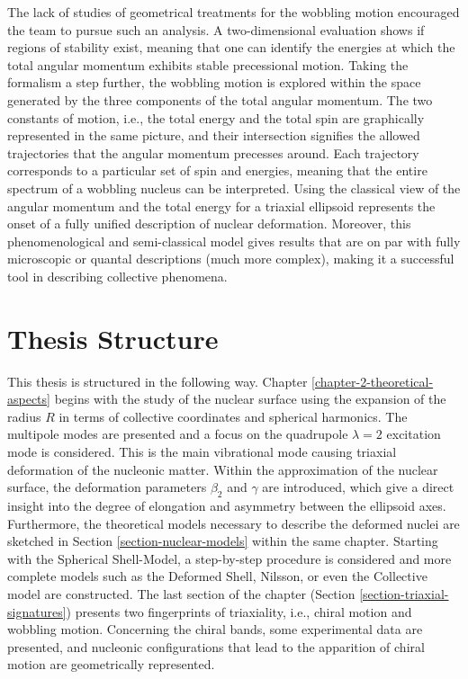 The lack of studies of geometrical treatments for the wobbling motion encouraged the team to pursue such an analysis. A two-dimensional evaluation shows if regions of stability exist, meaning that one can identify the energies at which the total angular momentum exhibits stable precessional motion. Taking the formalism a step further, the wobbling motion is explored within the space generated by the three components of the total angular momentum. The two constants of motion, i.e., the total energy and the total spin are graphically represented in the same picture, and their intersection signifies the allowed trajectories that the angular momentum precesses around. Each trajectory corresponds to a particular set of spin and energies, meaning that the entire spectrum of a wobbling nucleus can be interpreted. Using the classical view of the angular momentum and the total energy for a triaxial ellipsoid represents the onset of a fully unified description of nuclear deformation. Moreover, this phenomenological and semi-classical model gives results that are on par with fully microscopic or quantal descriptions (much more complex), making it a successful tool in describing collective phenomena.

\section{Thesis Structure}

This thesis is structured in the following way. Chapter \ref{chapter-2-theoretical-aspects} begins with the study of the nuclear surface using the expansion of the radius $R$ in terms of collective coordinates and spherical harmonics. The multipole modes are presented and a focus on the quadrupole $\lambda=2$ excitation mode is considered. This is the main vibrational mode causing triaxial deformation of the nucleonic matter. Within the approximation of the nuclear surface, the deformation parameters $\beta_2$ and $\gamma$ are introduced, which give a direct insight into the degree of elongation and asymmetry between the ellipsoid axes. Furthermore, the theoretical models necessary to describe the deformed nuclei are sketched in Section \ref{section-nuclear-models} within the same chapter. Starting with the Spherical Shell-Model, a step-by-step procedure is considered and more complete models such as the Deformed Shell, Nilsson, or even the Collective model are constructed. The last section of the chapter (Section \ref{section-triaxial-signatures}) presents two fingerprints of triaxiality, i.e., chiral motion and wobbling motion. Concerning the chiral bands, some experimental data are presented, and nucleonic configurations that lead to the apparition of chiral motion are geometrically represented. 

